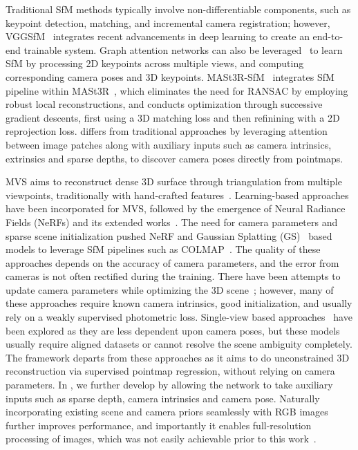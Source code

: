 Traditional SfM methods typically involve non-differentiable components, such as keypoint detection, matching, and incremental camera registration; however, VGGSfM~\cite{wang2023vggsfm} integrates recent advancements in deep learning to create an end-to-end trainable system.
Graph attention networks can also be leveraged~\cite{brynte2024learning} to learn SfM by processing 2D keypoints across multiple views, and computing corresponding camera poses and 3D keypoints.
MASt3R-SfM~\cite{duisterhof2024mast3r} integrates SfM pipeline within MASt3R~\cite{leroy2024mast3r}, which eliminates the need for RANSAC by employing robust local reconstructions, and conducts optimization through successive gradient descents, first using a 3D matching loss and then refinining with a 2D reprojection loss.
\ours{} differs from traditional approaches by leveraging attention between image patches along with auxiliary inputs such as camera intrinsics, extrinsics and sparse depths, to discover camera poses directly from pointmaps.

 MVS aims to reconstruct dense 3D surface through triangulation from multiple viewpoints, traditionally with hand-crafted features~\cite{furukawa2015multi, galliani2015massively, schonberger2016pixelwise}. 
Learning-based approaches have been incorporated for MVS, followed by the emergence of Neural Radiance Fields (NeRFs) and its extended works~\cite{niemeyer2020differentiable, yariv2020multiview, gu2020cascade, leroy2021volume, peng2022rethinking, yao2018mvsnet, mildenhall2021nerf, sitzmann2019srns}.
The need for camera parameters and sparse scene initialization pushed NeRF and Gaussian Splatting (GS)~\cite{kerbl20233d} based models to leverage SfM pipelines such as COLMAP~\cite{schonberger2016structure}.
The quality of these approaches depends on the accuracy of camera parameters, and the error from cameras is not often rectified during the training.
There have been attempts to update camera parameters while optimizing the 3D scene~\cite{lin2021barf, wang2021nerf, chen2023dbarf, jeong2021self, chng2022gaussian, park2023camp}; however, many of these approaches require known camera intrinsics, good initialization, and usually rely on a weakly supervised photometric loss.
Single-view based approaches~\cite{jang2021codenerf, yu2021pixelnerf,jang2024nvist,lin2023vision,sargent2023vq3d,chen2023explicit, szymanowicz2024splatter, chan2022efficient} have been explored as they are less dependent upon camera poses, but these models usually require aligned datasets or cannot resolve the scene ambiguity completely.
The \duster{} framework departs from these approaches as it aims to do unconstrained 3D reconstruction via supervised pointmap regression, without relying on camera parameters.
In \ours{}, we further develop \duster{} by allowing the network to take auxiliary inputs such as sparse depth, camera intrinsics and camera pose. Naturally incorporating existing scene and camera priors seamlessly with RGB images further improves performance, and importantly it enables full-resolution processing of images, which was not easily achievable prior to this work~\cite{winwin}.

